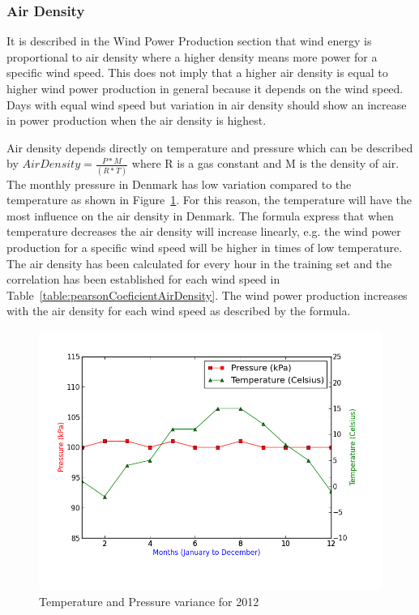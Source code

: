 \subsubsection{Air Density}
It is described in the Wind Power Production section that wind energy is proportional to air density where a higher density means more power for a specific wind speed. This does not imply that a higher air density is equal to higher wind power production in general because it depends on the wind speed. Days with equal wind speed but variation in air density should show an increase in power production when the air density is highest. 

Air density depends directly on temperature and pressure which can be described by $Air Density=\frac{P*M}{(R*T)}$ where R is a gas constant and M is the density of air. The monthly pressure in Denmark has low variation compared to the temperature as shown in Figure~\ref{fig:pressureTemperatureVariance}. For this reason, the temperature will have the most influence on the air density in Denmark. The formula express that when temperature decreases the air density will increase linearly, e.g. the wind power production for a specific wind speed will be higher in times of low temperature. The air density has been calculated for every hour in the training set and the correlation has been established for each wind speed in Table~\ref{table:pearsonCoeficientAirDensity}. The wind power production increases with the air density for each wind speed as described by the formula.

\begin{figure}[H]
\centering
\includegraphics[width=0.99\linewidth,natwidth=898,natheight=587]{billeder/pressureTemperatureVariance.png}
\caption{Temperature and Pressure variance for 2012}
\label{fig:pressureTemperatureVariance}
\end{figure}

